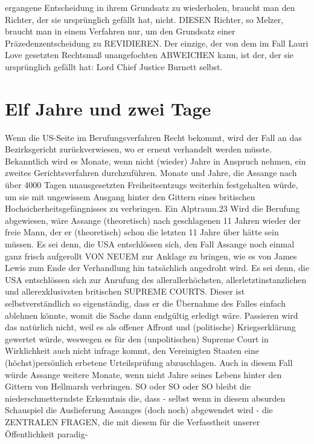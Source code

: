 \begin{multicols}{2}
ergangene Entscheidung in ihrem Grundsatz zu wiederholen, braucht man den Richter, der sie ursprünglich gefällt hat, nicht. DIESEN Richter, so Melzer, braucht man
in einem Verfahren nur, um den Grundsatz einer Präzedenzentscheidung zu REVIDIEREN. Der einzige, der von
dem im Fall Lauri Love gesetzten Rechtsmaß unangefochten ABWEICHEN kann, ist der, der sie ursprünglich
gefällt hat: Lord Chief Justice Burnett selbst.



\chapter{Elf Jahre und zwei Tage} %

Wenn die US-Seite im Berufungsverfahren Recht bekommt, wird der Fall an das Bezirksgericht zurückverwiesen, wo er erneut verhandelt werden müsste. Bekanntlich wird es Monate, wenn nicht (wieder) Jahre
in Anspruch nehmen, ein zweites Gerichtsverfahren
durchzuführen. Monate und Jahre, die Assange nach
über 4000 Tagen unausgesetzten Freiheitsentzugs weiterhin festgehalten würde, um sie mit ungewissem Ausgang hinter den Gittern eines britischen Hochsicherheitsgefängnisses zu verbringen. Ein Alptraum.23
Wird die Berufung abgewiesen, wäre Assange (theoretisch) nach geschlagenen 11 Jahren wieder der freie
Mann, der er (theoretisch) schon die letzten 11 Jahre
über hätte sein müssen.
Es sei denn, die USA entschlössen sich, den Fall Assange
noch einmal ganz frisch aufgerollt VON NEUEM zur Anklage zu bringen, wie es von James Lewis zum Ende der
Verhandlung hin tatsächlich angedroht wird.
Es sei denn, die USA entschlössen sich zur Anrufung
des allerallerhöchsten, allerletztinstanzlichen und allerexklusivsten britischen SUPREME COURTS. Dieser ist
selbstverständlich so eigenständig, dass er die Übernahme des Falles einfach ablehnen könnte, womit die
Sache dann endgültig erledigt wäre. Passieren wird das
natürlich nicht, weil es als offener Affront und (politische) Kriegserklärung gewertet würde, weswegen es
für den (unpolitischen) Supreme Court in Wirklichkeit
auch nicht infrage kommt, den Vereinigten Staaten eine
(höchst)persönlich erbetene Urteilsprüfung abzuschlagen.
Auch in diesem Fall würde Assange weitere Monate,
wenn nicht Jahre seines Lebens hinter den Gittern von
Hellmarsh verbringen.
SO oder SO oder SO bleibt die niederschmetterndste
Erkenntnis die, dass - selbst wenn in diesem absurden
Schauspiel die Auslieferung Assanges (doch noch) abgewendet wird - die ZENTRALEN FRAGEN, die mit diesem für die Verfasstheit unserer Öffentlichkeit paradig-


\end{multicols}
